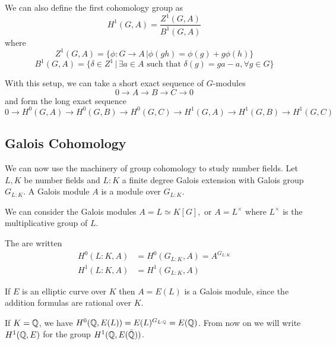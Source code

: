 \documentclass[12pt, a4paper]{amsart}
\begin{document}
We can also define the first cohomology group as
\[H^1(G, A) = \frac{Z^1(G,A)}{B^1(G,A)}\]
where
\[Z^1(G,A) = \{ \phi : G \rightarrow A \, | \phi(gh) = \phi(g) + g \phi(h)\}\]
\[B^1(G,A) = \{ \delta \in Z^1 \, | \, \exists a \in A \,\,\text{such that}\,\, \delta(g)
  = ga - a , \forall g \in G\}\]

\begin{prop}
  With this setup, we can take a short exact sequence of $G$-modules
  \[ 0 \rightarrow A \rightarrow B \rightarrow C \rightarrow 0\]
  and form the long exact sequence
  \[ 0 \rightarrow H^0(G, A) \rightarrow H^0(G,B) \rightarrow H^0(G,C)
    \rightarrow H^1(G, A) \rightarrow H^1(G,B) \rightarrow H^1(G,C) \]
\end{prop}

\subsection{Galois Cohomology}

We can now use the machinery of group cohomology to study number fields.
Let $L, K$ be number fields and $L : K$ a finite degree Galois
extension with Galois group $G_{L:K}$.
A Galois module $A$ is a module over $G_{L:K}$.

\begin{example}
  We can consider the Galois modules $A = L \simeq K[G], $ or $A =
  L^{\times}$ where $L^{\times}$ is the multiplicative group of $L$.
\end{example}


\begin{defn}
  The  are written
  \begin{equation*}
    \begin{split}
      H^0(L:K, A) &= H^0(G_{L:K}, A) = A^{G_{L:K}} \\
      H^1(L:K, A) &= H^1(G_{L:K}, A)
     \end{split}
   \end{equation*}
\end{defn}

\begin{example}
  If $E$ is an elliptic curve over $K$ then $A = E(L)$ is a Galois module,
  since the addition formulas are rational over $K$.

  If $K = {\mathbb Q}$, we have $H^0({\mathbb Q},E(L)) = E(L)^{G_{L:{\mathbb Q}}} = E({\mathbb Q})$.
  From now on we will write $H^1({\mathbb Q}, E)$ for the group $H^1({\mathbb Q}, E(\bar{{\mathbb Q}}))$.
\end{example}
\end{document}
